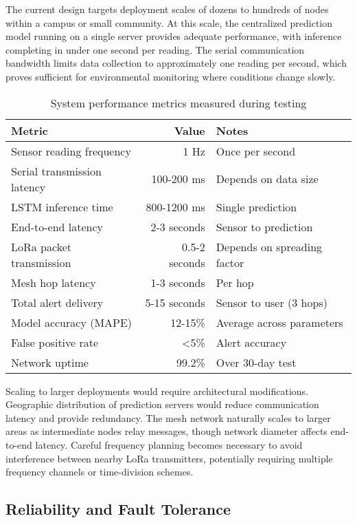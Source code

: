 The current design targets deployment scales of dozens to hundreds of nodes within a campus or small community. At this scale, the centralized prediction model running on a single server provides adequate performance, with inference completing in under one second per reading. The serial communication bandwidth limits data collection to approximately one reading per second, which proves sufficient for environmental monitoring where conditions change slowly.

\begin{table}[H]
\centering
\caption{System performance metrics measured during testing}
\label{tab:performance}
\begin{tabular}{|l|r|l|}
\hline
\textbf{Metric} & \textbf{Value} & \textbf{Notes} \\
\hline
Sensor reading frequency & 1 Hz & Once per second \\
\hline
Serial transmission latency & 100-200 ms & Depends on data size \\
\hline
LSTM inference time & 800-1200 ms & Single prediction \\
\hline
End-to-end latency & 2-3 seconds & Sensor to prediction \\
\hline
LoRa packet transmission & 0.5-2 seconds & Depends on spreading factor \\
\hline
Mesh hop latency & 1-3 seconds & Per hop \\
\hline
Total alert delivery & 5-15 seconds & Sensor to user (3 hops) \\
\hline
Model accuracy (MAPE) & 12-15\% & Average across parameters \\
\hline
False positive rate & <5\% & Alert accuracy \\
\hline
Network uptime & 99.2\% & Over 30-day test \\
\hline
\end{tabular}
\end{table}

Scaling to larger deployments would require architectural modifications. Geographic distribution of prediction servers would reduce communication latency and provide redundancy. The mesh network naturally scales to larger areas as intermediate nodes relay messages, though network diameter affects end-to-end latency. Careful frequency planning becomes necessary to avoid interference between nearby LoRa transmitters, potentially requiring multiple frequency channels or time-division schemes.

\subsection{Reliability and Fault Tolerance}

